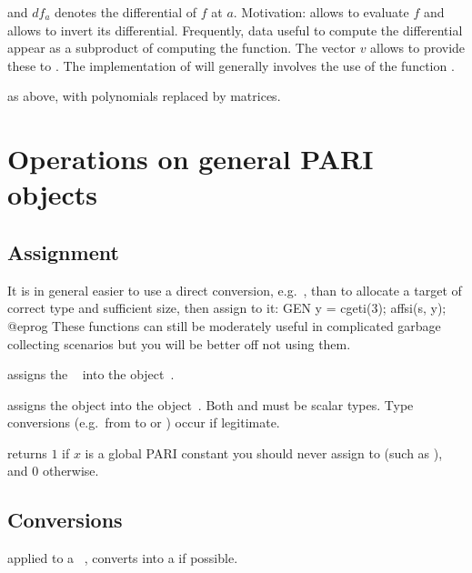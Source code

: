 \noindent and $df_a$ denotes the differential of $f$ at $a$. Motivation:
 allows to evaluate $f$ and  allows to invert its
differential. Frequently, data useful to compute the differential appear as a
subproduct of computing the function. The vector $v$ allows  to
provide these to . The implementation of  will generally
involves the use of the function .

as above, with polynomials replaced by matrices.

\newpage
\chapter{Operations on general PARI objects}

\section{Assignment}

It is in general easier to use a direct conversion,
e.g.~, than to allocate a target of correct type and
sufficient size, then assign to it:
\bprog
  GEN y = cgeti(3); affsi(s, y);
@eprog\noindent
These functions can still be moderately useful in complicated garbage
collecting scenarios but you will be better off not using them.

 assigns the ~ into the
object~.

 assigns the object  into the
object~. Both  and  must be scalar types. Type
conversions (e.g.~from  to  or ) occur if
legitimate.

 returns $1$ if $x$ is a global PARI
constant you should never assign to (such as ), and $0$
otherwise.

\section{Conversions}


 applied to a ~, converts 
into a  if possible.

